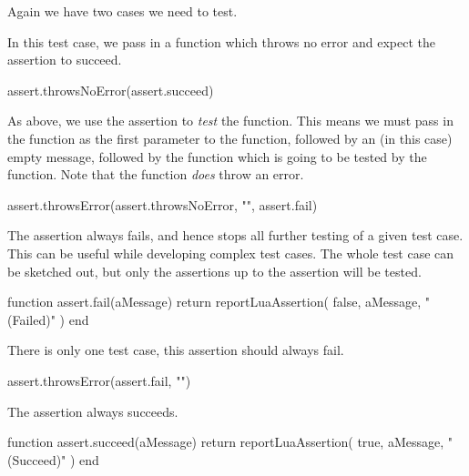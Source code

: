Again we have two cases we need to test.


In this test case, we pass in a function which throws no error and expect 
the assertion to succeed. 

\startLuaTest
  assert.throwsNoError(assert.succeed)
\stopLuaTest
\stopTestCase


As above, we use the  assertion to \emph{test} 
the  function. This means we must pass in the 
 function as the first parameter to the 
  function, followed by an (in this 
case) empty message, followed by the function which is going to be tested 
by the  function. Note that the 
 function \emph{does} throw an error. 

\startLuaTest
  assert.throwsError(assert.throwsNoError, "", assert.fail)
\stopLuaTest
\stopTestCase

\stopTestSuite


The  assertion always fails, and hence stops all further 
testing of a given test case. This can be useful while developing complex 
test cases. The whole test case can be sketched out, but only the 
assertions up to the  assertion will be tested. 

\startLuaCode
function assert.fail(aMessage)
  return reportLuaAssertion(
    false,
    aMessage,
    "(Failed)"
  )
end
\stopLuaCode


There is only one test case, this assertion should always fail.

\startLuaTest
  assert.throwsError(assert.fail, "")
\stopLuaTest
\stopTestCase

\stopTestSuite


The  assertion always succeeds.

\startLuaCode
function assert.succeed(aMessage)
  return reportLuaAssertion(
    true,
    aMessage,
    "(Succeed)"
  )
end
\stopLuaCode



